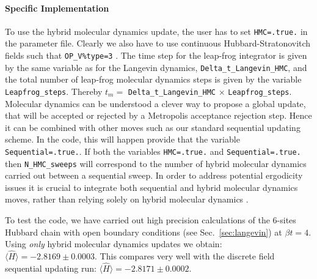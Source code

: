 \paragraph{Specific Implementation}
To  use  the    hybrid   molecular  dynamics  update,   the  user  has  to set \texttt{HMC=.true.}  in the  parameter  file.  Clearly  we  also  have  to use 
continuous  Hubbard-Stratonovitch  fields  such that
  \texttt{OP\_V\%type=3} . 
  The  time  step  for  the  leap-frog  integrator is  given  by  the   same  variable as for  the  Langevin dynamics, \texttt{Delta\_t\_Langevin\_HMC},   and  the  total  number of  leap-frog   molecular  dynamics  steps  is  given by  the  variable  \texttt{Leapfrog\_steps}.  Thereby   $ t_m = $ \texttt{Delta\_t\_Langevin\_HMC} $\times $ \texttt{Leapfrog\_steps}.  
Molecular  dynamics can  be  understood  a  clever  way  to  propose  a  global update,  that  will be  accepted  or  rejected  by  a  Metropolis   acceptance  rejection step.   Hence  it  can be combined  with  other   moves  such as  our  standard  sequential  updating scheme.   In the  code,  this  will happen  provide  that  the variable  \texttt{Sequential=.true.}.    If  both  the variables \texttt{HMC=.true.}   and   \texttt{Sequential=.true.}   then \texttt{N\_HMC\_sweeps}    will
correspond  to the  number  of   hybrid   molecular  dynamics   carried out between  a  sequential  sweep. 
In order to address potential ergodicity issues \cite{Beyl17} it is crucial to integrate both sequential and hybrid molecular dynamics moves,
 rather than relying solely on hybrid molecular dynamics \cite{Imada88}. 
 
 To  test  the  code,  we  have  carried  out  high precision calculations  of  the  6-sites   Hubbard  chain  with  open boundary  conditions  (see  Sec.~\ref{sec:langevin})  at  $\beta t  = 4$.     Using \textit{only}   hybrid   molecular  dynamics  updates  we  obtain:  $ \langle  \hat{H} \rangle = -2.8169   \pm 0.0003 $.  This  compares  very  well  with  the  discrete  field    sequential  updating run: $ \langle  \hat{H} \rangle = -2.8171  \pm 0.0002 $. 


